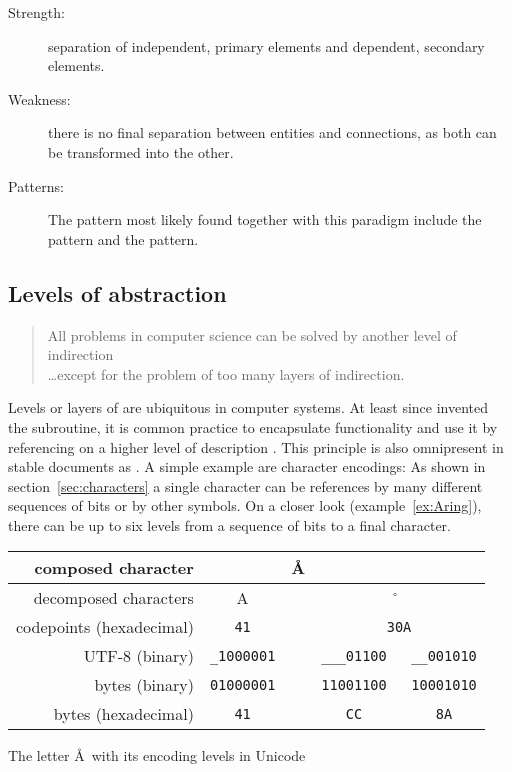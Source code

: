 \begin{description}
\item[Strength:] separation of independent, primary elements and dependent, 
  secondary elements.
\item[Weakness:] there is no final separation between entities and 
  connections, as both can be transformed into the other.
\item[Patterns:] The pattern most likely found together with
  this paradigm include the  pattern and the
   pattern.
\end{description}


\subsection{Levels of abstraction}
\label{sec:levels}

\begin{quotation}%
All problems in computer science can be solved by another level of indirection
\\\ldots{}except for the problem of too many layers of indirection.
\\\quotationsource {}
\end{quotation}

\noindent Levels or layers of  are ubiquitous in computer
systems. At least since  invented the subroutine, it is
common practice to encapsulate functionality and use it by referencing on a
higher level of description \cite{Spinellis2007}. This principle is also
omnipresent in stable documents as . A simple example
are character encodings: As shown in section~\ref{sec:characters} a single
character can be references by many different sequences of bits or by other
symbols. On a closer look (example~\ref{ex:Aring}), there can be up to six
levels from a sequence of bits to a final  character.

\begin{example}[h]
\centering
\begin{tabular}{r|ccc}
composed character & & \AA \\ %
\hline
decomposed characters & A & & \r{} \\
\hline
codepoints (hexadecimal) & \texttt{41} & & \texttt{30A} \\
\hline
UTF-8 (binary)      & \texttt{\_1000001} &
& \verb|___01100   __001010| \\
\hline
bytes (binary)      & \texttt{01000001} &
 & \verb|11001100   10001010| \\
\hline 
bytes (hexadecimal)  & \texttt{41} &
  & \verb|CC         8A| \\
\end{tabular}
\caption{The letter \AA~with its encoding levels in Unicode}
\label{ex:Aring}
\end{example}

